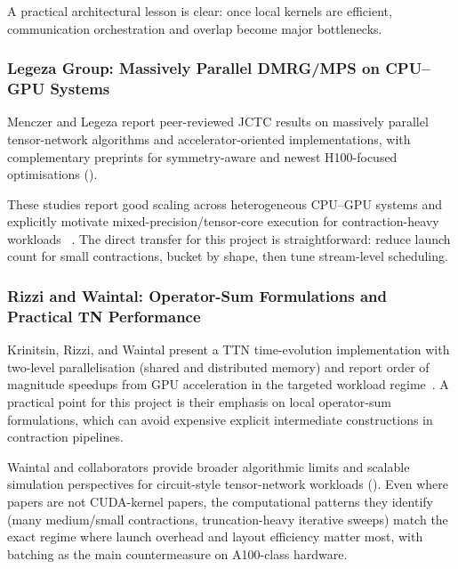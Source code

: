 A practical architectural lesson is clear: once local kernels are efficient,
communication orchestration and overlap become major bottlenecks.

\subsubsection{Legeza Group: Massively Parallel DMRG/MPS on CPU--GPU Systems}

Menczer and Legeza report peer-reviewed JCTC results on massively parallel
tensor-network algorithms and accelerator-oriented implementations, with
complementary preprints for symmetry-aware and newest H100-focused
optimisations
(\cite{menczer2025massive-jctc,menczer2024ai-accelerators-jctc,menczer2023nonabelian,menczer2024efficient-dmrg-gpu}).

These studies report good scaling across heterogeneous CPU--GPU systems and
explicitly motivate mixed-precision/tensor-core execution for
contraction-heavy workloads
~\cite{menczer2025massive-jctc,menczer2024ai-accelerators-jctc,menczer2024efficient-dmrg-gpu}.
The direct transfer for this project is straightforward: reduce launch count for
small contractions, bucket by shape, then tune stream-level scheduling.

\subsubsection{Rizzi and Waintal: Operator-Sum Formulations and Practical TN Performance}

Krinitsin, Rizzi, and Waintal present a TTN time-evolution implementation with
two-level parallelisation (shared and distributed memory) and report order of
magnitude speedups from GPU acceleration in the targeted workload
regime~\cite{krinitsin2025ttn-ed}. A practical point for this project is their
emphasis on local operator-sum formulations, which can avoid expensive explicit
intermediate constructions in contraction pipelines.

Waintal and collaborators provide broader algorithmic limits and scalable
simulation perspectives for circuit-style tensor-network workloads
(\cite{zhou2020limits,ayral2023dmrg-circuit-fidelity}).
Even where papers are not CUDA-kernel papers, the computational patterns they
identify (many medium/small contractions, truncation-heavy iterative sweeps)
match the exact regime where launch overhead and layout efficiency matter most,
with batching as the main countermeasure on A100-class hardware.

